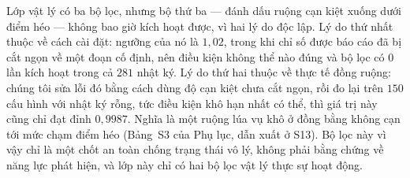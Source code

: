 \begin{remark}
\label{sec:v2reach}
Lớp vật lý có ba bộ lọc, nhưng bộ thứ ba --- đánh dấu ruộng cạn kiệt xuống dưới
điểm héo --- không bao giờ kích hoạt được, vì hai lý do độc lập. Lý do thứ nhất
thuộc về cách cài đặt: ngưỡng của nó là $1{,}02$, trong khi chỉ số được báo cáo đã
bị cắt ngọn về một đoạn cố định, nên điều kiện không thể nào đúng và bộ lọc có $0$
lần kích hoạt trong cả $281$ nhật ký. Lý do thứ hai thuộc về thực tế đồng ruộng:
chúng tôi sửa lỗi đó bằng cách dùng độ cạn kiệt chưa cắt ngọn, rồi đo lại trên
$150$ cấu hình với nhật ký rỗng, tức điều kiện khô hạn nhất có thể, thì giá trị này
cũng chỉ đạt đỉnh $0{,}9987$. Nghĩa là một ruộng lúa vụ khô ở đồng bằng không cạn
tới mức chạm điểm héo (Bảng~S3 của Phụ lục, dẫn xuất ở S13). Bộ lọc này vì vậy chỉ
là một chốt an toàn chống trạng thái vô lý, không phải bằng chứng về năng lực phát
hiện, và lớp này chỉ có hai bộ lọc vật lý thực sự hoạt động.
\end{remark}
